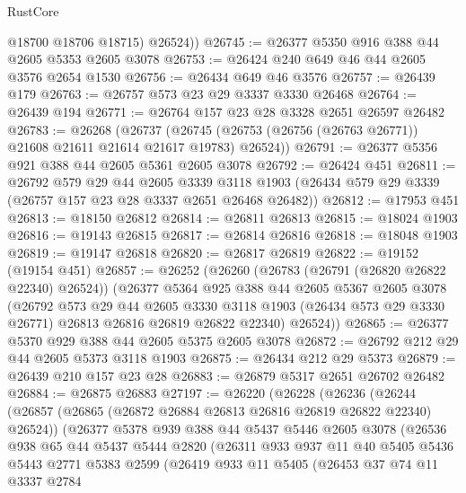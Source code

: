 \begin{lexlean}{RustCore}
\begin{coremodule}
          @18700
          @18706
          @18715)
        @26524))
@26745 := @26377 @5350 @916 @388 @44 @2605 @5353 @2605 @3078
@26753 := @26424 @240 @649 @46 @44 @2605 @3576 @2654 @1530
@26756 := @26434 @649 @46 @3576
@26757 := @26439 @179
@26763 := @26757 @573 @23 @29 @3337 @3330 @26468
@26764 := @26439 @194
@26771 := @26764 @157 @23 @28 @3328 @2651 @26597 @26482
@26783 := @26268
    (@26737 (@26745 (@26753 (@26756 (@26763 @26771)) @21608 @21611 @21614 @21617 @19783) @26524))
@26791 := @26377 @5356 @921 @388 @44 @2605 @5361 @2605 @3078
@26792 := @26424 @451
@26811 := @26792
    @579
    @29
    @44
    @2605
    @3339
    @3118
    @1903
    (@26434 @579 @29 @3339 (@26757 @157 @23 @28 @3337 @2651 @26468 @26482))
@26812 := @17953 @451
@26813 := @18150 @26812
@26814 := @26811 @26813
@26815 := @18024 @1903
@26816 := @19143 @26815
@26817 := @26814 @26816
@26818 := @18048 @1903
@26819 := @19147 @26818
@26820 := @26817 @26819
@26822 := @19152 (@19154 @451)
@26857 := @26252
    (@26260
      (@26783 (@26791 (@26820 @26822 @22340) @26524))
      (@26377
        @5364
        @925
        @388
        @44
        @2605
        @5367
        @2605
        @3078
        (@26792
          @573
          @29
          @44
          @2605
          @3330
          @3118
          @1903
          (@26434 @573 @29 @3330 @26771)
          @26813
          @26816
          @26819
          @26822
          @22340)
        @26524))
@26865 := @26377 @5370 @929 @388 @44 @2605 @5375 @2605 @3078
@26872 := @26792 @212 @29 @44 @2605 @5373 @3118 @1903
@26875 := @26434 @212 @29 @5373
@26879 := @26439 @210 @157 @23 @28
@26883 := @26879 @5317 @2651 @26702 @26482
@26884 := @26875 @26883
@27197 := @26220
    (@26228
      (@26236
        (@26244
          (@26857 (@26865 (@26872 @26884 @26813 @26816 @26819 @26822 @22340) @26524))
          (@26377
            @5378
            @939
            @388
            @44
            @5437
            @5446
            @2605
            @3078
            (@26536
              @938
              @65
              @44
              @5437
              @5444
              @2820
              (@26311
                @933
                @937
                @11
                @40
                @5405
                @5436
                @5443
                @2771
                @5383
                @2599
                (@26419
                  @933
                  @11
                  @5405
                  (@26453
                    @37
                    @74
                    @11
                    @3337
                    @2784

\end{coremodule}
\end{lexlean}
